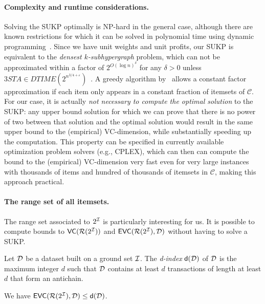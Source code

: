 
\paragraph{Complexity and runtime considerations.} Solving the SUKP optimally is
NP-hard in the general case, although there are known restrictions for which it
can be solved in polynomial time using dynamic
programming~\citep{GoldschmidtNY94}. Since we have unit weights and unit
profits, our SUKP is equivalent to the \emph{densest $k$-subhypergraph} problem,
which can not be approximated within a factor of $2^{O(\log n)^\delta}$ for any
$\delta>0$ unless $3STA \in
DTIME(2^{n^{3/4+\varepsilon}})$~\citep{HajiaghayiJKLMRSV06}. A greedy algorithm
by~\citet{Arulselvan14} allows a constant factor approximation if each
item only appears in a constant fraction of itemsets of $\mathcal{C}$. For our
case, it is actually \emph{not necessary to compute the optimal solution} to the
SUKP: any upper bound solution for which we can prove that there is no power of
two between that solution and the optimal solution would result in the
same upper bound to the (empirical) VC-dimension, while substantially
speeding up the computation. This property can be specified in currently
available optimization problem solvers (e.g., CPLEX), which can then can compute
the bound to the (empirical) VC-dimension very fast even for very large
instances with thousands of items and hundred of thousands of itemsets in
$\mathcal{C}$, making this approach practical.

\paragraph{The range set of all itemsets.}
The range set associated to $2^{\cal I}$ is particularly interesting for us. It is
possible to compute bounds to $\mathsf{VC}(\mathcal{R}(2^{\cal I}))$ and $\mathsf{EVC}(\mathcal{R}(2^{\cal I}),
{\cal D})$ without having to solve a SUKP.
\begin{theorem}\label{thm:empvcdimubfirst}
  Let ${\cal D}$ be a dataset built on a
  ground set ${\cal I}$. The
  \emph{d-index} $\mathsf{d}({\cal D})$ of ${\cal D}$ is the maximum integer $d$ such that
  ${\cal D}$ contains at least $d$ transactions of length at least $d$ that form an
  antichain.

  We have $\mathsf{EVC}(\mathcal{R}(2^{\cal I}),{\cal D})\le \mathsf{d}({\cal D})$.
\end{theorem}

